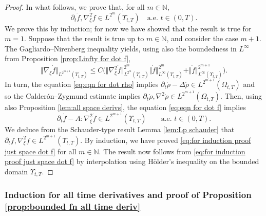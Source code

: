 \documentclass[11pt,a4paper,reqno]{amsart}
\theoremstyle{remark}
\theoremstyle{definition}
\numberwithin{equation}{section}
\newcommand{\bxi}{\xi}
\begin{document}
\begin{proof}
In what follows, we prove that, for all $m\in\mathbb{N}$, 
\begin{equation}\label{eq:for induction proof just space dot f}
    \partial_t \dot{f}, \nabla^2_{\bxi} \dot{f} \in L^{2^m}(\Upsilon_{t,T}) \quad \text{a.e.~}t\in(0,T). 
\end{equation}
We prove this by induction; for now we have showed that the result is true for $m=1$. Suppose that the result is true up to $m\in\mathbb{N}$, and consider the case $m+1$. The Gagliardo--Nirenberg inequality yields, using also the boundedness in $L^\infty$ from Proposition \ref{prop:Linfty for dot f}, 
\begin{equation*}
    \Vert \nabla_{\bxi} \dot{f} \Vert_{L^{2^{m+1}}(\Upsilon_{t,T})} \leq C \Big( \Vert \nabla_{\bxi}^2 \dot{f} \Vert_{L^{2^{m}}(\Upsilon_{t,T})}^{2^{m}} \Vert \dot{f} \Vert_{L^\infty(\Upsilon_{t,T})}^{2^{m}} + \Vert \dot{f} \Vert_{L^\infty(\Upsilon_{t,T})}^{2^{m+1}} \Big). 
\end{equation*}
In turn, the equation \eqref{eq:eqn for dot rho} implies $\partial_t \dot{\rho} - \Delta \dot{\rho} \in L^{2^{m+1}}(\Omega_{t,T})$ and so the Calder\'on--Zygmund estimate implies $\partial_t \dot{\rho},\nabla^2 \dot{\rho} \in L^{2^{m+1}}(\Omega_{t,T})$. Then, using also Proposition \ref{lem:all space derivs}, the equation \eqref{eq:eqn for dot f} implies 
\begin{equation*}
    \partial_t \dot{f} - A:\nabla^2_{\bxi} \dot{f} \in L^{2^{m+1}}(\Upsilon_{t,T}) \qquad \text{a.e.~}t\in(0,T). 
\end{equation*}
We deduce from the Schauder-type result Lemma \ref{lem:Lp schauder} that $\partial_t \dot{f} , \nabla^2_{\bxi} \dot{f} \in L^{2^{m+1}}(\Upsilon_{t,T})$. By induction, we have proved \eqref{eq:for induction proof just space dot f} for all $m\in\mathbb{N}$. The result now follows from \eqref{eq:for induction proof just space dot f} by interpolation using H\"older's inequality on the bounded domain $\Upsilon_{t,T}$.
\end{proof}














\subsubsection{Induction for all time derivatives and proof of Proposition \ref{prop:bounded fn all time deriv}}
\end{document}
